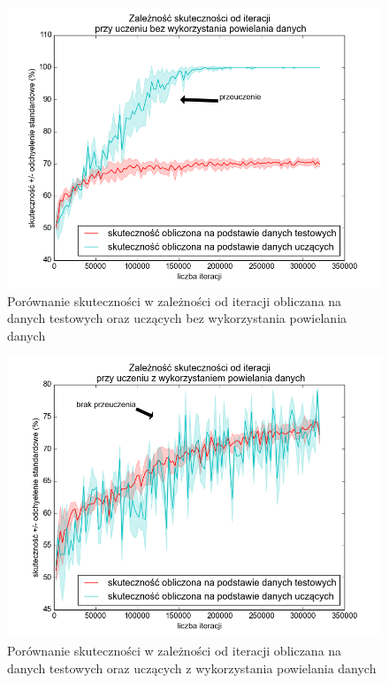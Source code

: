\begin{figure}[ht!]
\centering
\includegraphics[scale=0.7]{res/testtrain_mulitply.png}
\caption[Caption for LOF]{Porównanie skuteczności w zależności od iteracji obliczana na danych testowych oraz uczących bez wykorzystania powielania danych\label{cd2}}
\end{figure} 

\begin{figure}[ht!]
\centering
\includegraphics[scale=0.7]{res/testtrain_runtime.png}
\caption[Caption for LOF]{Porównanie skuteczności w zależności od iteracji obliczana na danych testowych oraz uczących z wykorzystania powielania danych\label{cd3}}
\end{figure} 

